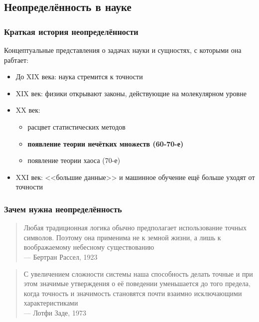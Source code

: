 \documentclass{beamer}
\begin{document}
\subsection{Неопределённость в науке}

\begin{frame}\frametitle{Краткая история неопределённости}
Концептуальные представления о задачах науки и сущностях, с которыми она рабтает:
\begin{itemize}
    \item До XIX века: наука стремится к точности
    \item XIX век: физики открывают законы, действующие на молекулярном уровне
    \item XX век: 
    \begin{itemize} 
        \item расцвет статистических методов
        \item \textbf{появление теории нечётких множеств (60-70-е)}
        \item появление теории хаоса (70-е)
    \end{itemize}
    \item XXI век: <<большие данные>> и машинное обучение ещё больше уходят от точности
\end{itemize}

\end{frame}

\begin{frame}\frametitle{Зачем нужна неопределённость}
    \begin{quote}
        Любая традиционная логика обычно предполагает использование точных символов. Поэтому она применима не к земной жизни, а лишь к воображаемому небесному существованию \\ \hfill --- Бертран Рассел, 1923
    \end{quote}
    \begin{quote}
        С увеличением сложности системы наша способность делать точные и при этом значимые утверждения о её поведении уменьшается до того предела, когда точность и значимость становятся почти взаимно исключающими характеристиками \\ \hfill --- Лотфи Заде, 1973
    \end{quote}
\end{frame}
\end{document}
